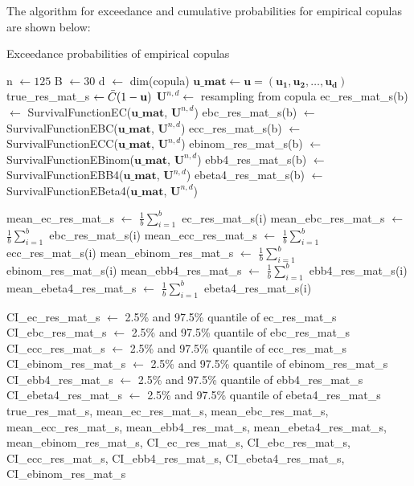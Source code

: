 \documentclass[12pt]{report}
\newcommand{\1}{\mathbf{1}}
\begin{document}
\begin{flushleft}
The algorithm for exceedance and cumulative probabilities for empirical copulas are shown below: \\
\begin{algorithm}[H]
\caption{Exceedance probabilities of empirical copulas}
\begin{algorithmic}
 
    \State n $\gets 125$
    \State B $\gets 30$
    \State d $\gets$ dim(copula)
    \State $\mathbf{u\_mat} \gets \mathbf{u} = (\mathbf{u_{1}}, \mathbf{u_{2}}, \dots, \mathbf{u_{d}})$ 
    \State true\_res\_mat\_s $\gets \Bar{C}(1 - \textbf{u})$ 
        \State $\textbf{U}^{n,d} \gets$ resampling from copula 
        \State ec\_res\_mat\_s(b) $\gets$ SurvivalFunctionEC($\mathbf{u\_mat}$, $\textbf{U}^{n,d}$)
        \State ebc\_res\_mat\_s(b) $\gets$ SurvivalFunctionEBC($\mathbf{u\_mat}$, $\textbf{U}^{n,d}$)
        \State ecc\_res\_mat\_s(b) $\gets$ SurvivalFunctionECC($\mathbf{u\_mat}$, $\textbf{U}^{n,d}$)
        \State ebinom\_res\_mat\_s(b) $\gets$ SurvivalFunctionEBinom($\mathbf{u\_mat}$, $\textbf{U}^{n,d}$)
        \State ebb4\_res\_mat\_s(b) $\gets$ SurvivalFunctionEBB4($\mathbf{u\_mat}$, $\textbf{U}^{n,d}$)
        \State ebeta4\_res\_mat\_s(b) $\gets$ SurvivalFunctionEBeta4($\mathbf{u\_mat}$, $\textbf{U}^{n,d}$)

    \EndFor
    \State mean\_ec\_res\_mat\_s $\gets$ $\frac{1}{b}\sum\limits_{i = 1}^{b}$ ec\_res\_mat\_s(i)
    \State mean\_ebc\_res\_mat\_s $\gets$ $\frac{1}{b}\sum\limits_{i = 1}^{b}$ ebc\_res\_mat\_s(i)
    \State mean\_ecc\_res\_mat\_s $\gets$ $\frac{1}{b}\sum\limits_{i = 1}^{b}$ ecc\_res\_mat\_s(i)
    \State mean\_ebinom\_res\_mat\_s $\gets$ $\frac{1}{b}\sum\limits_{i = 1}^{b}$ ebinom\_res\_mat\_s(i)
    \State mean\_ebb4\_res\_mat\_s $\gets$ $\frac{1}{b}\sum\limits_{i = 1}^{b}$ ebb4\_res\_mat\_s(i)
    \State mean\_ebeta4\_res\_mat\_s $\gets$ $\frac{1}{b}\sum\limits_{i = 1}^{b}$ ebeta4\_res\_mat\_s(i)

    \State CI\_ec\_res\_mat\_s $\gets$ 2.5\% and 97.5\% quantile of ec\_res\_mat\_s
    \State CI\_ebc\_res\_mat\_s $\gets$ 2.5\% and 97.5\% quantile of ebc\_res\_mat\_s
    \State CI\_ecc\_res\_mat\_s $\gets$ 2.5\% and 97.5\% quantile of ecc\_res\_mat\_s
    \State CI\_ebinom\_res\_mat\_s $\gets$ 2.5\% and 97.5\% quantile of ebinom\_res\_mat\_s
    \State CI\_ebb4\_res\_mat\_s $\gets$ 2.5\% and 97.5\% quantile of ebb4\_res\_mat\_s
    \State CI\_ebeta4\_res\_mat\_s $\gets$ 2.5\% and 97.5\% quantile of ebeta4\_res\_mat\_s
    \State \Return true\_res\_mat\_s, mean\_ec\_res\_mat\_s, mean\_ebc\_res\_mat\_s, mean\_ecc\_res\_mat\_s, mean\_ebb4\_res\_mat\_s, mean\_ebeta4\_res\_mat\_s, mean\_ebinom\_res\_mat\_s, CI\_ec\_res\_mat\_s, CI\_ebc\_res\_mat\_s, CI\_ecc\_res\_mat\_s, CI\_ebb4\_res\_mat\_s, CI\_ebeta4\_res\_mat\_s, CI\_ebinom\_res\_mat\_s
\EndProcedure
\end{algorithmic}
\end{algorithm}


\end{flushleft}
\end{document}
